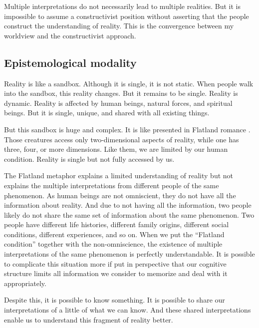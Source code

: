 Multiple interpretations do not necessarily lead to multiple realities. But it is impossible to assume a constructivist position without asserting that the people construct the understanding of reality. This is the convergence between my worldview and the constructivist approach.

\subsection{Epistemological modality}

Reality is like a sandbox. Although it is single, it is not static. When people walk into the sandbox, this reality changes. But it remains to be single. Reality is dynamic. Reality is affected by human beings, natural forces, and spiritual beings. But it is single, unique, and shared with all existing things.

But this sandbox is huge and complex. It is like presented in Flatland romance \cite{abbott:1884}. Those creatures access only two-dimensional aspects of reality, while one has three, four, or more dimensions. Like them, we are limited by our human condition. Reality is single but not fully accessed by us.

The Flatland metaphor explains a limited understanding of reality but not explains the multiple interpretations from different people of the same phenomenon. As human beings are not omniscient, they do not have all the information about reality. And due to not having all the information, two people likely do not share the same set of information about the same phenomenon. Two people have different life histories, different family origins, different social conditions, different experiences, and so on. When we put the “Flatland condition” together with the non-omniscience, the existence of multiple interpretations of the same phenomenon is perfectly understandable. It is possible to complicate this situation more if put in perspective that our cognitive structure limits all information we consider to memorize and deal with it appropriately. 

Despite this, it is possible to know something. It is possible to share our interpretations of a little of what we can know. And these shared interpretations enable us to understand this fragment of reality better.


                
